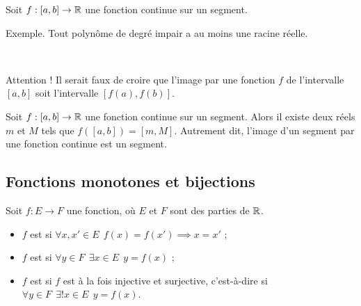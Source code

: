 \documentclass[10pt,class=article,crop=false]{standalone}
\begin{document}
\begin{multicols}{2}


\begin{corollaire}
	Soit $f:[a,b]\to\mathbb{R}$ une fonction continue sur un segment.
	\mybox{Si $f(a)\cdot f(b)<0$, alors il existe $c\in {}]a,b[$ tel que $f(c)=0$.}
\end{corollaire}



Exemple. Tout polynôme de degré impair a au moins une racine réelle.


\begin{corollaire}~
\end{corollaire}

Attention ! Il serait faux de croire que l'image par une fonction $f$ de l'intervalle $[a,b]$
soit l'intervalle $[f(a),f(b)]$.



\begin{theoreme}
	Soit $f:[a,b]\to\mathbb{R}$ une fonction continue sur un segment.
	Alors il existe deux réels $m$ et $M$ tels que $f([a,b])=[m,M]$.
	Autrement dit, l'image d'un segment par une fonction continue est un segment.
\end{theoreme}







	
\subsection{Fonctions monotones et bijections}


	Soit $f:E\to F$ une fonction, où $E$ et $F$ sont des parties de $\mathbb{R}$.
	\begin{itemize}
		\item $f$ est  si $\forall x,x'\in E \ \ f(x)=f(x') \implies x=x'$ ;
		\item $f$ est  si $\forall y\in F \ \ \exists x\in E \ \ y=f(x)$ ;
		\item $f$ est  si $f$ est à la fois injective et surjective,
		c'est-à-dire si $\forall y\in F \ \ \exists! x\in E \ \ y=f(x)$.
	\end{itemize}


\end{multicols}
\end{document}
